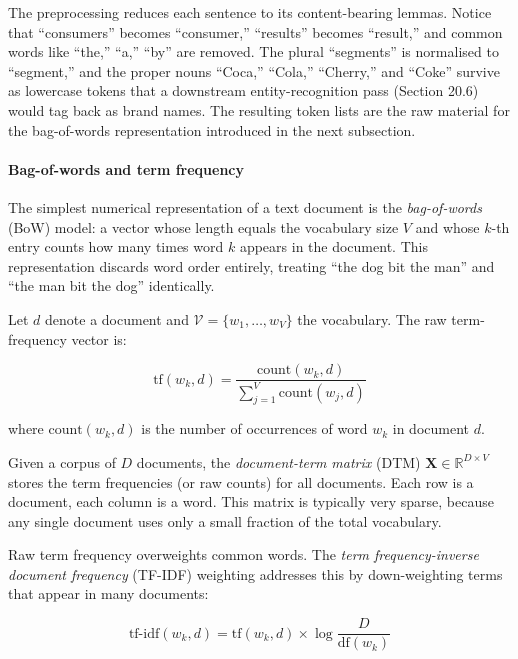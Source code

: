 The preprocessing reduces each sentence to its content-bearing lemmas. Notice that ``consumers'' becomes ``consumer,'' ``results'' becomes ``result,'' and common words like ``the,'' ``a,'' ``by'' are removed. The plural ``segments'' is normalised to ``segment,'' and the proper nouns ``Coca,'' ``Cola,'' ``Cherry,'' and ``Coke'' survive as lowercase tokens that a downstream entity-recognition pass (Section 20.6) would tag back as brand names. The resulting token lists are the raw material for the bag-of-words representation introduced in the next subsection.

\paragraph{Bag-of-words and term frequency}

The simplest numerical representation of a text document is the \textit{bag-of-words} (BoW) model: a vector whose length equals the vocabulary size $V$ and whose $k$-th entry counts how many times word $k$ appears in the document. This representation discards word order entirely, treating ``the dog bit the man'' and ``the man bit the dog'' identically.

Let $d$ denote a document and $\mathcal{V} = \{w_1, \ldots, w_V\}$ the vocabulary. The raw term-frequency vector is:

\begin{equation}
\text{tf}(w_k, d) = \frac{\text{count}(w_k, d)}{\sum_{j=1}^{V} \text{count}(w_j, d)}
\tag{20.1}
\end{equation}

where $\text{count}(w_k, d)$ is the number of occurrences of word $w_k$ in document $d$.

Given a corpus of $D$ documents, the \textit{document-term matrix} (DTM) $\mathbf{X} \in \mathbb{R}^{D \times V}$ stores the term frequencies (or raw counts) for all documents. Each row is a document, each column is a word. This matrix is typically very sparse, because any single document uses only a small fraction of the total vocabulary.

Raw term frequency overweights common words. The \textit{term frequency-inverse document frequency} (TF-IDF) weighting addresses this by down-weighting terms that appear in many documents:

\begin{equation}
\text{tf-idf}(w_k, d) = \text{tf}(w_k, d) \times \log \frac{D}{\text{df}(w_k)}
\tag{20.2}
\end{equation}

